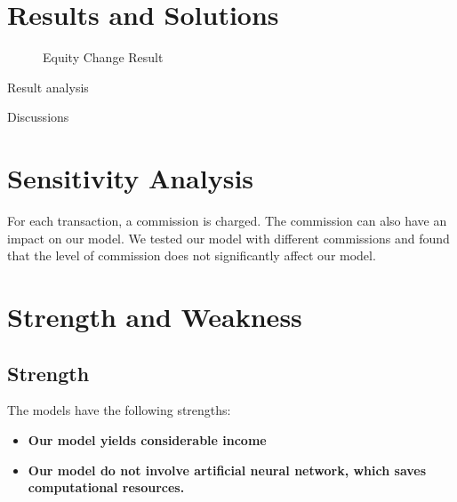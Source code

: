 \documentclass[12pt,a4paper]{article}
\begin{document}
\begin{spacing}{1.2}
\section{Results and Solutions}
\label{Results_Solutions}

\begin{figure}[H]
	\caption{Equity Change Result}
	\label{figure:equity_change}
\end{figure}

Result analysis

Discussions



\section{Sensitivity Analysis}
\label{SensitivityAnalysis}

For each transaction, a commission is charged. The commission can also have an impact on our model. We tested our model with different commissions and found that the level of commission does not significantly affect our model.

\section{Strength and Weakness}
\label{Strength_Weakness}


\subsection{Strength}

The models have the following strengths:

\begin{itemize}
\item \textbf{Our model yields considerable income}

\item \textbf{Our model do not involve artificial neural network, which saves computational resources.}


\end{itemize}
\end{spacing}
\end{document}
